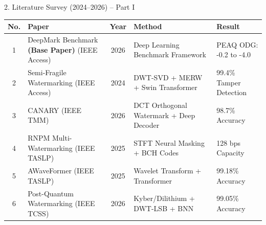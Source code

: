 \documentclass[10pt, aspectratio=169]{beamer}
\begin{document}
\begin{frame}{2. Literature Survey (2024--2026) -- Part I}

\small
\renewcommand{\arraystretch}{1.6}

\begin{center}
\begin{tabular}{|c|p{3.3cm}|c|p{3.7cm}|p{2.6cm}|}
\hline
\textbf{No.} &
\textbf{Paper} &
\textbf{Year} &
\textbf{Method} &
\textbf{Result} \\
\hline

1 &
DeepMark Benchmark \textbf{(Base Paper)} (IEEE Access) &
2026 &
Deep Learning Benchmark Framework &
PEAQ ODG: -0.2 to -4.0 \\
\hline

2 &
Semi-Fragile Watermarking (IEEE Access) &
2024 &
DWT-SVD + MERW + Swin Transformer &
99.4\% Tamper Detection \\
\hline

3 &
CANARY (IEEE TMM) &
2026 &
DCT Orthogonal Watermark + Deep Decoder &
98.7\% Accuracy \\
\hline

4 &
RNPM Multi-Watermarking (IEEE TASLP) &
2025 &
STFT Neural Masking + BCH Codes &
128 bps Capacity \\
\hline

5 &
AWaveFormer (IEEE TASLP) &
2025 &
Wavelet Transform + Transformer &
99.18\% Accuracy \\
\hline

6 &
Post-Quantum Watermarking (IEEE TCSS) &
2026 &
Kyber/Dilithium + DWT-LSB + BNN &
99.05\% Accuracy \\
\hline

\end{tabular}
\end{center}

\end{frame}

\end{document}
